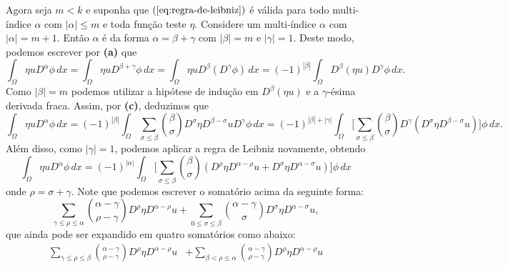 \documentclass[a4paper, 11pt]{book}
\theoremstyle{definition}
\begin{document}
\begin{prf}
    Agora seja $m < k$ e suponha que $(\ref{eq:regra-de-leibniz})$ é válida para todo multi-índice $\alpha$ com $|\alpha| \leqslant m$ e toda função teste $\eta$.
    Considere um multi-índice $\alpha$ com $|\alpha| = m + 1$.
    Então $\alpha$ é da forma $\alpha = \beta + \gamma$ com $|\beta| = m$ e $|\gamma| = 1$. 
    Deste modo, podemos escrever por \textbf{(a)} que
    \[
        \int_\Omega \eta u D^{\alpha}\phi \, dx = \int_\Omega \eta u D^{\beta + \gamma}\phi \, dx = \int_\Omega \eta u D^\beta(D^\gamma \phi) \, dx = (-1)^{|\beta|} \int_\Omega D^{\beta} (\eta u) D^{\gamma}\phi \,dx.
    \]
    Como $|\beta| = m$ podemos utilizar a hipótese de indução em $D^{\beta}(\eta u)$ e a $\gamma$-ésima derivada fraca. Assim, por \textbf{(c)}, deduzimos que
    {\small
    \[
        \int_\Omega \eta u D^{\alpha}\phi \, dx = (-1)^{|\beta|} \int_\Omega \sum_{\sigma \leqslant \beta} \binom{\beta}{\sigma} D^{\sigma} \eta D^{\beta - \sigma} u D^{\gamma}\phi \, dx = (-1)^{|\beta| + |\gamma|} \int_\Omega \bigg[\sum_{\sigma \leqslant \beta} \binom{\beta}{\sigma} D^{\gamma}(D^{\sigma} \eta D^{\beta - \sigma} u)\bigg] \phi \, dx.
    \]}\!
    Além disso, como $|\gamma| = 1$, podemos aplicar a regra de Leibniz novamente, obtendo
    \begin{equation} \label{eq:integral-etau}
        \int_\Omega \eta u D^{\alpha}\phi \, dx = (-1)^{|\alpha|} \int_\Omega \bigg[\sum_{\sigma \leqslant \beta} \binom{\beta}{\sigma} \left(D^{\rho}\eta D^{\alpha - \rho} u + D^{\sigma} \eta D^{\alpha - \sigma} u\right)\bigg] \phi \,dx
    \end{equation}
    onde $\rho = \sigma + \gamma$. 
    Note que podemos escrever o somatório acima da seguinte forma:
    \begin{equation*} \label{eq:somatorio}
        \sum_{\gamma \leqslant \rho \leqslant \alpha} \binom{\alpha - \gamma}{\rho - \gamma} D^{\rho}\eta D^{\alpha - \rho} u + \sum_{0 \leqslant\sigma \leqslant \beta} \binom{\alpha - \gamma}{\sigma} D^{\sigma} \eta D^{\alpha - \sigma} u,
    \end{equation*}
    que ainda pode ser expandido em quatro somatórios como abaixo:
    \begin{equation} \label{eq:somatorio-2}
        \begin{aligned}
            \sum_{\gamma \leqslant \rho \leqslant \beta} \binom{\alpha - \gamma}{\rho - \gamma} D^{\rho}\eta D^{\alpha - \rho} u &+ \sum_{\beta < \rho \leqslant \alpha} \binom{\alpha - \gamma}{\rho - \gamma} D^{\rho}\eta D^{\alpha - \rho} u \\

\end{aligned}
\end{equation}
\end{prf}
\end{document}
